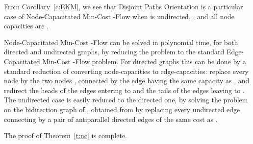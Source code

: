 \documentclass[envcountsame]{llncs}
\begin{document}
\vspace{0.1cm}

\begin{center} 
\end{center}

\vspace{0.1cm}

From Corollary~\ref{c:EKM}, we see that {\sf  Disjoint Paths Orientation} is a particular case of 
{\sf Node-Capacitated Min-Cost -Flow} when  is undirected, , and all node capacities are .

{\sf Node-Capacitated Min-Cost -Flow} can be solved in polynomial time, for both directed and undirected graphs,
by reducing the problem to the standard {\sf Edge-Capacitated Min-Cost -Flow} problem.
For directed graphs this can be done by a standard reduction of converting node-capacities
to edge-capacities: replace every node  by the two
nodes , connected by the edge  having the same capacity as , and redirect the
heads of the edges entering  to  and the tails of the edges leaving  to .
The undirected case is easily reduced to the directed one, by solving the problem on the 
bidirection graph of , obtained from  by replacing every undirected edge  connecting 
by a pair of antiparallel directed edges  of the same cost as .

The proof of Theorem~\ref{t:nc} is complete.



\end{document}
